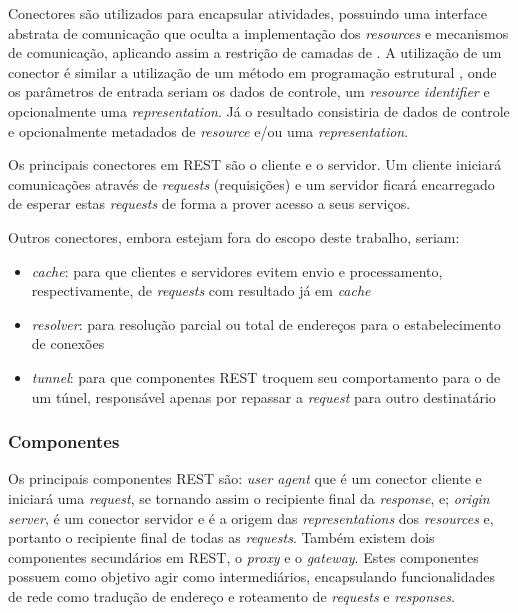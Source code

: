 Conectores são utilizados para encapsular atividades, possuindo uma interface abstrata de comunicação que oculta a implementação dos \textit{resources} e mecanismos de comunicação, aplicando assim a restrição de camadas de . A utilização de um conector é similar a utilização de um método em programação estrutural \cite{WATT:2004}, onde os parâmetros de entrada seriam os dados de controle, um \textit{resource identifier} e opcionalmente uma \textit{representation}. Já o resultado consistiria de dados de controle e opcionalmente metadados de \textit{resource} e/ou uma \textit{representation}.

Os principais conectores em REST são o cliente e o servidor. Um cliente iniciará comunicações através de \textit{requests} (requisições) e um servidor ficará encarregado de esperar estas \textit{requests} de forma a prover acesso a seus serviços.

Outros conectores, embora estejam fora do escopo deste trabalho, seriam:

\begin{itemize}
    \item \textit{cache}: para que clientes e servidores evitem envio e processamento, respectivamente, de \textit{requests} com resultado já em \textit{cache}
    \item \textit{resolver}: para resolução parcial ou total de endereços para o estabelecimento de conexões
    \item \textit{tunnel}: para que componentes REST troquem seu comportamento para o de um túnel, responsável apenas por repassar a \textit{request} para outro destinatário
\end{itemize}




\subsubsection{Componentes}

Os principais componentes REST são: \textit{user agent} que é um conector cliente e iniciará uma \textit{request}, se tornando assim o recipiente final da \textit{response}, e; \textit{origin server}, é um conector servidor e é a origem das \textit{representations} dos \textit{resources} e, portanto o recipiente final de todas as \textit{requests}. Também existem dois componentes secundários em REST, o \textit{proxy} \cite{WWWProxy:1994} e o \textit{gateway}. Estes componentes possuem como objetivo agir como intermediários, encapsulando funcionalidades de rede como tradução de endereço e roteamento de \textit{requests} e \textit{responses}.

